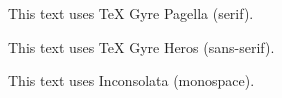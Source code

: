 \documentclass[12pt, a4paper]{article}
\begin{document}
This text uses TeX Gyre Pagella (serif).

\sffamily This text uses TeX Gyre Heros (sans-serif).

\ttfamily This text uses Inconsolata (monospace).
\end{document}
